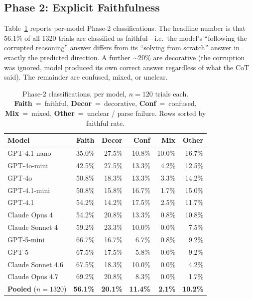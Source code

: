 \documentclass{article}
\begin{document}
\subsection{Phase 2: Explicit Faithfulness}

Table~\ref{tab:phase2} reports per-model Phase-2 classifications. The headline number is that 56.1\% of all 1320 trials are classified as faithful---i.e.\ the model's ``following the corrupted reasoning'' answer differs from its ``solving from scratch'' answer in exactly the predicted direction. A further $\sim$20\% are decorative (the corruption was ignored, model produced its own correct answer regardless of what the CoT said). The remainder are confused, mixed, or unclear.

\begin{table}[t]
\centering
\small
\caption{Phase-2 classifications, per model, $n=120$ trials each. \textbf{Faith}~=~faithful, \textbf{Decor}~=~decorative, \textbf{Conf}~=~confused, \textbf{Mix}~=~mixed, \textbf{Other}~=~unclear / parse failure. Rows sorted by faithful rate.}
\label{tab:phase2}
\begin{tabular}{@{}lrrrrr@{}}
\toprule
Model & Faith & Decor & Conf & Mix & Other \\
\midrule
GPT-4.1-nano               & 35.0\% & 27.5\% & 10.8\% & 10.0\% & 16.7\% \\
GPT-4o-mini                & 42.5\% & 27.5\% & 13.3\% &  4.2\% & 12.5\% \\
GPT-4o                     & 50.8\% & 18.3\% & 13.3\% &  3.3\% & 14.2\% \\
GPT-4.1-mini               & 50.8\% & 15.8\% & 16.7\% &  1.7\% & 15.0\% \\
GPT-4.1                    & 54.2\% & 14.2\% & 17.5\% &  2.5\% & 11.7\% \\
Claude Opus 4              & 54.2\% & 20.8\% & 13.3\% &  0.8\% & 10.8\% \\
Claude Sonnet 4            & 59.2\% & 23.3\% & 10.0\% &  0.0\% &  7.5\% \\
GPT-5-mini                 & 66.7\% & 16.7\% &  6.7\% &  0.8\% &  9.2\% \\
GPT-5                      & 67.5\% & 17.5\% &  5.8\% &  0.0\% &  9.2\% \\
Claude Sonnet 4.6          & 67.5\% & 18.3\% & 10.0\% &  0.0\% &  4.2\% \\
Claude Opus 4.7            & 69.2\% & 20.8\% &  8.3\% &  0.0\% &  1.7\% \\
\midrule
\textbf{Pooled} ($n{=}1320$) & \textbf{56.1\%} & \textbf{20.1\%} & \textbf{11.4\%} & \textbf{2.1\%} & \textbf{10.2\%} \\
\bottomrule
\end{tabular}
\end{table}
\end{document}
